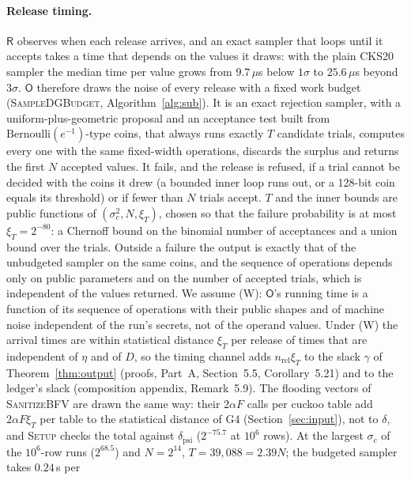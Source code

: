 \documentclass[11pt]{article}
\newif\ifshowchecks
\newcounter{checkitem}
\newcommand{\tocheck}[1]{%
  \ifshowchecks
    \refstepcounter{checkitem}%
    \addcontentsline{loc}{checkitem}{\protect\numberline{\thecheckitem}#1}%
    {\color{red!65!black}\sffamily\small[\textbf{Check~\thecheckitem:} #1]}%
  \fi}
\theoremstyle{definition}
\theoremstyle{plain}
\newcommand{\Party}[1]{\textsf{#1}}
\newcommand{\Rp}{\Party{R}}
\newcommand{\Op}{\Party{O}}
\begin{document}
\tocheck{(T1) Hwang et al.\ (ePrint 2025/395; the later version's title, used in the bibliography, is ``On the (In)security of Approximate Computation Protocols from CKKS'', listed as accepted at ASIACRYPT 2026): the definitions and the two-party obstruction were checked against the authors' FHE.org 2026 poster only, and the abstract, the later title and the venue only through search-engine extracts. Confirm against the full text the exact standard and liberal definitions; that the obstruction needs the corrupted party's noise share to be non-negligible next to the rest of the output noise; and the statement for the case of one party with input. Fix the venue in the bibliography once confirmed.}

\paragraph{Release timing.} $\Rp$ observes when each release arrives, and an exact sampler that loops until it accepts takes a time that depends on the values it draws: with the plain CKS20 sampler the median time per value grows from $9.7\,\mu$s below $1\sigma$ to $25.6\,\mu$s beyond $3\sigma$. $\Op$ therefore draws the noise of every release with a fixed work budget (\textsc{SampleDGBudget}, Algorithm~\ref{alg:sub}). It is an exact rejection sampler, with a uniform-plus-geometric proposal and an acceptance test built from $\mathrm{Bernoulli}(e^{-1})$-type coins, that always runs exactly $T$ candidate trials, computes every one with the same fixed-width operations, discards the surplus and returns the first $N$ accepted values. It fails, and the release is refused, if a trial cannot be decided with the coins it drew (a bounded inner loop runs out, or a 128-bit coin equals its threshold) or if fewer than $N$ trials accept. $T$ and the inner bounds are public functions of $(\sigma_c^2, N, \xi_T)$, chosen so that the failure probability is at most $\xi_T = 2^{-80}$: a Chernoff bound on the binomial number of acceptances and a union bound over the trials. Outside a failure the output is exactly that of the unbudgeted sampler on the same coins, and the sequence of operations depends only on public parameters and on the number of accepted trials, which is independent of the values returned. We assume (W): $\Op$'s running time is a function of its sequence of operations with their public shapes and of machine noise independent of the run's secrets, not of the operand values. Under (W) the arrival times are within statistical distance $\xi_T$ per release of times that are independent of $\eta$ and of $D$, so the timing channel adds $n_{\mathrm{rel}}\xi_T$ to the slack $\gamma$ of Theorem~\ref{thm:output} (proofs, Part~A, Section~5.5, Corollary~5.21) and to the ledger's slack (composition appendix, Remark~5.9). The flooding vectors of \textsc{SanitizeBFV} are drawn the same way: their $2\alpha F$ calls per cuckoo table add $2\alpha F\xi_T$ per table to the statistical distance of G4 (Section~\ref{sec:input}), not to $\delta$, and \textsc{Setup} checks the total against $\delta_{\mathrm{psi}}$ ($2^{-75.7}$ at $10^6$ rows). At the largest $\sigma_c$ of the $10^6$-row runs ($2^{68.5}$) and $N = 2^{14}$, $T = 39{,}088 = 2.39N$; the budgeted sampler takes $0.24$\,s per 
\end{document}
